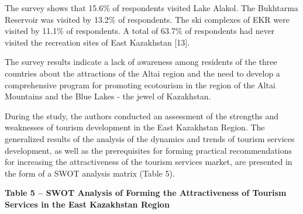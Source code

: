 The survey shows that 15.6\% of respondents visited Lake Alakol. The
Bukhtarma Reservoir was visited by 13.2\% of respondents. The ski
complexes of EKR were visited by 11.1\% of respondents. A total of
63.7\% of respondents had never visited the recreation sites of East
Kazakhstan {[}13{]}.

The survey results indicate a lack of awareness among residents of the
three countries about the attractions of the Altai region and the need
to develop a comprehensive program for promoting ecotourism in the
region of the Altai Mountains and the Blue Lakes - the jewel of
Kazakhstan.

During the study, the authors conducted an assessment of the strengths
and weaknesses of tourism development in the East Kazakhstan Region. The
generalized results of the analysis of the dynamics and trends of
tourism services development, as well as the prerequisites for forming
practical recommendations for increasing the attractiveness of the
tourism services market, are presented in the form of a SWOT analysis
matrix (Table 5).

{\bfseries Table 5 -- SWOT Analysis of Forming the Attractiveness of
Tourism Services in the East Kazakhstan Region}

